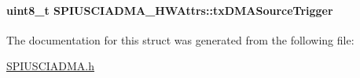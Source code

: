 \paragraph[{tx\+D\+M\+A\+Source\+Trigger}]{\setlength{\rightskip}{0pt plus 5cm}uint8\+\_\+t S\+P\+I\+U\+S\+C\+I\+A\+D\+M\+A\+\_\+\+H\+W\+Attrs\+::tx\+D\+M\+A\+Source\+Trigger}\label{struct_s_p_i_u_s_c_i_a_d_m_a___h_w_attrs_a1d2a5cd21e6ebcde08a6632b79c6231b}


The documentation for this struct was generated from the following file\+:\begin{DoxyCompactItemize}
\item 
\hyperlink{_s_p_i_u_s_c_i_a_d_m_a_8h}{S\+P\+I\+U\+S\+C\+I\+A\+D\+M\+A.\+h}\end{DoxyCompactItemize}
